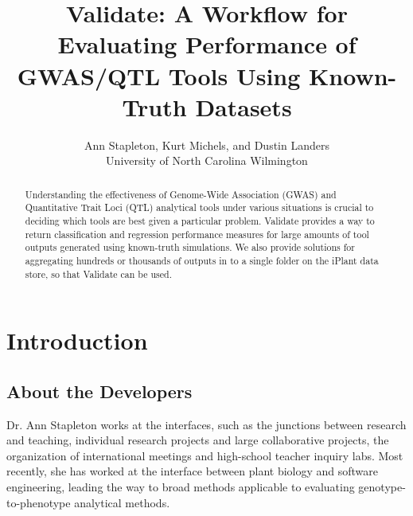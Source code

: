 \documentclass[twoside,a4paper]{refart}
\title{Validate: A Workflow for Evaluating Performance of GWAS/QTL Tools Using Known-Truth Datasets}
\author{Ann Stapleton, Kurt Michels, and Dustin Landers \\
University of North Carolina Wilmington \\
}
\date{}
\begin{document}
\maketitle

\begin{abstract}
        Understanding the effectiveness of Genome-Wide Association (GWAS) and Quantitative Trait Loci (QTL) analytical tools under various situations is crucial to deciding which tools are best given a particular problem. Validate provides a way to return classification and regression performance measures for large amounts of tool outputs generated using known-truth simulations. We also provide solutions for aggregating hundreds or thousands of outputs in to a single folder on the iPlant data store, so that Validate can be used.\end{abstract}

\tableofcontents

\newpage


\begin{center}
\end{center}

\section{Introduction}

\subsection{About the Developers}

Dr. Ann Stapleton works at the interfaces, such as the junctions between research and teaching, individual research projects and large collaborative projects, the organization of international meetings and high-school teacher inquiry labs. Most recently, she has worked at the interface between plant biology and software engineering, leading the way to broad methods applicable to evaluating genotype-to-phenotype analytical methods.
\end{document}
